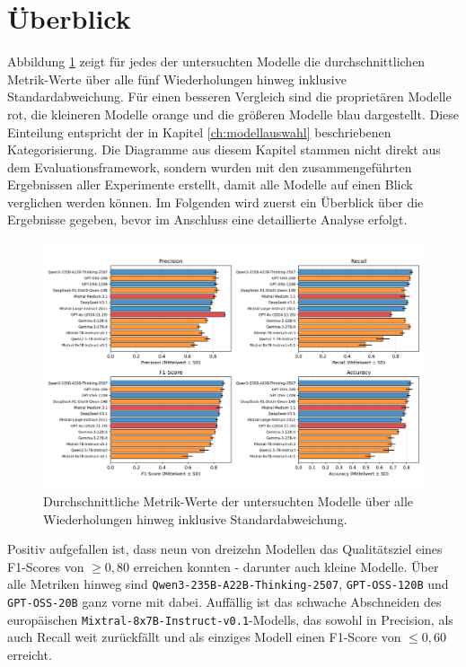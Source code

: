 \section{Überblick}\label{sec:ueberblick}

Abbildung \ref{fig:results-evaluation-metrics-comparison} zeigt für jedes der untersuchten Modelle die durchschnittlichen Metrik-Werte über alle fünf Wiederholungen hinweg inklusive Standardabweichung. Für einen besseren Vergleich sind die proprietären Modelle rot, die kleineren Modelle orange und die größeren Modelle blau dargestellt. Diese Einteilung entspricht der in Kapitel \ref{ch:modellauswahl} beschriebenen Kategorisierung. Die Diagramme aus diesem Kapitel stammen nicht direkt aus dem Evaluationsframework, sondern wurden mit den zusammengeführten Ergebnissen aller Experimente erstellt, damit alle Modelle auf einen Blick verglichen werden können. Im Folgenden wird zuerst ein Überblick über die Ergebnisse gegeben, bevor im Anschluss eine detaillierte Analyse erfolgt.

\begin{figure}[htbp]
    \centering
    \includegraphics[width=\textwidth,trim=20 40 20 10]{images/results/evaluation_metrics_comparison}
    \caption{Durchschnittliche Metrik-Werte der untersuchten Modelle über alle Wiederholungen hinweg inklusive Standardabweichung.}
    \label{fig:results-evaluation-metrics-comparison}
\end{figure}

Positiv aufgefallen ist, dass neun von dreizehn Modellen das Qualitätsziel eines F1-Scores von $\geq 0{,}80$ erreichen konnten - darunter auch kleine Modelle. Über alle Metriken hinweg sind \texttt{Qwen3-235B-A22B-Thinking-2507}, \texttt{GPT-OSS-120B} und \texttt{GPT-OSS-20B} ganz vorne mit dabei. Auffällig ist das schwache Abschneiden des europäischen \texttt{Mixtral-8x7B-Instruct-v0.1}-Modells, das sowohl in Precision, als auch Recall weit zurückfällt und als einziges Modell einen F1-Score von $\le 0{,}60$ erreicht.

